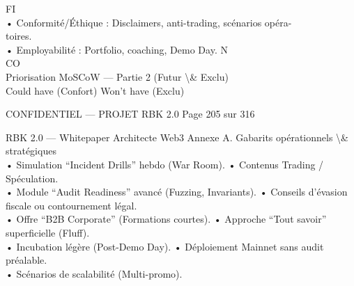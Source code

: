 \vspace{0.5em}
\vspace{0.5em}
\vspace{0.5em}
\vspace{0.5em}
FI\\
• Conformité/Éthique : Disclaimers, anti-trading, scénarios opéra-\\
toires.\\
• Employabilité : Portfolio, coaching, Demo Day. N\\
CO\\
\vspace{0.5em}
Priorisation MoSCoW — Partie 2 (Futur \textbackslash{}& Exclu)\\
\vspace{0.5em}
\vspace{0.5em}
Could have (Confort)                                                    Won’t have (Exclu)\\
\vspace{0.5em}
\vspace{0.5em}
\vspace{0.5em}
\vspace{0.5em}
\begin{confidential}CONFIDENTIEL — PROJET RBK 2.0                                   Page 205 sur 316\end{confidential}
RBK 2.0 — Whitepaper Architecte Web3                                                           Annexe A. Gabarits opérationnels \textbackslash{}& stratégiques\\
\vspace{0.5em}
\vspace{0.5em}
\vspace{0.5em}
• Simulation “Incident Drills” hebdo (War Room).                   • Contenus Trading / Spéculation.\\
• Module “Audit Readiness” avancé (Fuzzing, Invariants).           • Conseils d’évasion fiscale ou contournement légal.\\
• Offre “B2B Corporate” (Formations courtes).                      • Approche “Tout savoir” superficielle (Fluff).\\
• Incubation légère (Post-Demo Day).                               • Déploiement Mainnet sans audit préalable.\\
• Scénarios de scalabilité (Multi-promo).\\
\vspace{0.5em}
\vspace{0.5em}
\vspace{0.5em}
